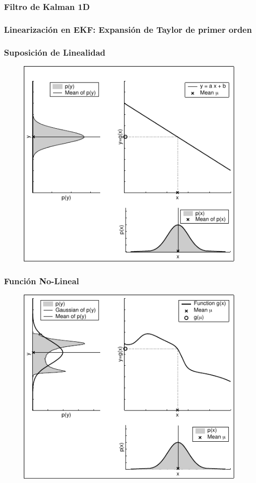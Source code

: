 \begin{frame}
	\frametitle{Filtro de Kalman 1D}
	
\end{frame}

\begin{frame}
	\frametitle{Linearización en EKF: Expansión de Taylor de primer orden}
	
\end{frame}


\begin{frame}
	\frametitle{Suposición de Linealidad}
	
	\begin{figure}[!h]
		\includegraphics[width=0.5\columnwidth]{./images/linear_transformation_of_a_gaussian.pdf}
	\end{figure}
\end{frame}

\begin{frame}
	\frametitle{Función No-Lineal}
	
	\begin{figure}[!h]
		\includegraphics[width=0.5\columnwidth]{./images/nonlinear_transformation_of_a_gaussian.pdf}
	\end{figure}
\end{frame}


